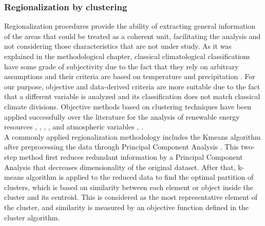 \subsubsection{Regionalization by clustering}

Regionalization procedures provide the ability of extracting general information of the areas that could be treated as a coherent unit, facilitating the analysis and not considering those characteristics that are not under study. As it was explained in the methodological chapter, classical climatological classifications have some grade of subjectivity due to the fact that they rely on arbitrary assumptions \citep{Kottek2006} and their criteria are based on temperature and precipitation \citep{trewartha1980koppen}. For our purpose, objective and data-derived criteria are more suitable due to the fact that a different variable is analyzed and its classification does not match classical climate divisions. Objective methods based on clustering techniques have been applied successfully over the literature for the analysis of renewable energy resources \citep{Polo2015}, \citep{Zagouras2013}, \citep{Zagouras2014}, \citep{Zagouras.Pedro.2014}, \citep{gomez2015characterization} and atmospheric variables \citep{Argueso2011}, \citep{garcia2012seasonal}. \\


A commonly applied regionalization methodology includes the Kmeans algorithm after preprocessing the data through Principal Component Analysis \citep{Ding2004}. This two-step method first reduces redundant information by a Principal Component Analysis that decreases dimensionality of the original dataset. After that, k-means algorithm is applied to the reduced data to find the optimal partition of clusters, which is based on similarity between each element or object inside the cluster and its centroid. This is considered as the most representative element of the cluster, and similarity is measured by an objective function defined in the cluster algorithm.\\

